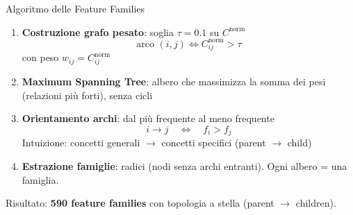 \documentclass[aspectratio=169, 10pt]{beamer}
\begin{document}
\begin{frame}{Algoritmo delle Feature Families}
    \begin{enumerate}
 

        \item \textbf{Costruzione grafo pesato}: soglia $\tau = 0.1$ su $C^{\text{norm}}$
        \[
            \text{arco } (i,j) \iff C^{\text{norm}}_{ij} > \tau
        \]
        con peso $w_{ij} = C^{\text{norm}}_{ij}$

        \item \textbf{Maximum Spanning Tree}: albero che massimizza la somma dei pesi (relazioni pi\`u forti), senza cicli

        \item \textbf{Orientamento archi}: dal pi\`u frequente al meno frequente
        \[
            i \to j \quad \iff \quad f_i > f_j
        \]
        {\small Intuizione: concetti generali $\to$ concetti specifici (parent $\to$ child)}

        \item \textbf{Estrazione famiglie}: radici (nodi senza archi entranti). Ogni albero = una famiglia.

    \end{enumerate}

    \vspace{0.2cm}
    \centering
    {\small\color{gray!60} Risultato: \textbf{590 feature families} con topologia a stella (parent $\to$ children).}
\end{frame}
\end{document}
